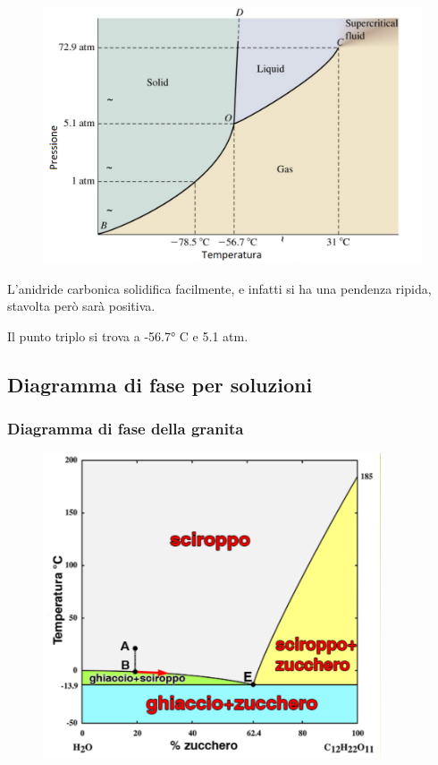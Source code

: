 \begin{figure}[htp]
    \centering
    \includegraphics[width=12cm]{immagini/diagramma_di_stato_CO2.png}
\end{figure}

L'anidride carbonica solidifica facilmente, e infatti si ha una pendenza ripida, stavolta però sarà positiva.

Il punto triplo si trova a -56.7° C e 5.1 atm.

\subsection{Diagramma di fase per soluzioni}
\subsubsection{Diagramma di fase della granita}

\begin{figure}[htp]
    \centering
    \includegraphics[width=10cm]{immagini/diagramma_di_stato_sciroppo.png}
\end{figure}

